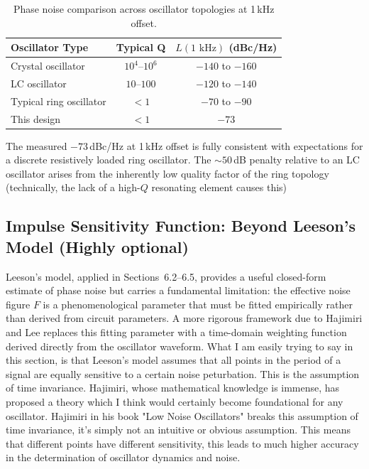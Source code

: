 \documentclass[11pt]{article}
\begin{document}
\begin{table}[h]
    \centering
    \caption{Phase noise comparison across oscillator topologies at 1\,kHz offset.}
    \label{tab:phase_noise_comparison}
    \begin{tabular}{lcc}
        \hline
        \textbf{Oscillator Type} & \textbf{Typical Q} & \textbf{$L(1\text{ kHz})$ (dBc/Hz)} \\
        \hline
        Crystal oscillator      & $10^4$--$10^6$ & $-140$ to $-160$ \\
        LC oscillator           & $10$--$100$    & $-120$ to $-140$ \\
        Typical ring oscillator & $<1$           & $-70$ to $-90$   \\
        This design             & $<1$           & $-73$            \\
        \hline
    \end{tabular}
\end{table}

The measured $-73$\,dBc/Hz at 1\,kHz offset is fully consistent with expectations for a
discrete resistively loaded ring oscillator. The $\sim 50$\,dB penalty relative to an LC
oscillator arises from the inherently low quality factor of the ring topology (technically, the lack of a high-$Q$ resonating element causes this)
\subsection{Impulse Sensitivity Function: Beyond Leeson's Model (Highly optional)}
 
Leeson's model, applied in Sections~6.2--6.5, provides a useful closed-form
estimate of phase noise but carries a fundamental limitation: the effective noise
figure $F$ is a phenomenological parameter that must be fitted empirically rather
than derived from circuit parameters. A more rigorous framework due to
Hajimiri and Lee replaces this fitting parameter with a
time-domain weighting function derived directly from the oscillator waveform.
What I am easily trying to say in this section, is that Leeson's model assumes that all points in the period of a signal are equally sensitive to a certain noise peturbation. This is the assumption of time invariance. Hajimiri, whose mathematical knowledge is immense, has proposed a theory which I think would certainly become foundational for any oscillator. Hajimiri in his book "Low Noise Oscillators" breaks this assumption of time invariance, it's simply not an intuitive or obvious assumption. This means that different points have different sensitivity, this leads to much higher accuracy in the determination of oscillator dynamics and noise.
 
\end{document}
